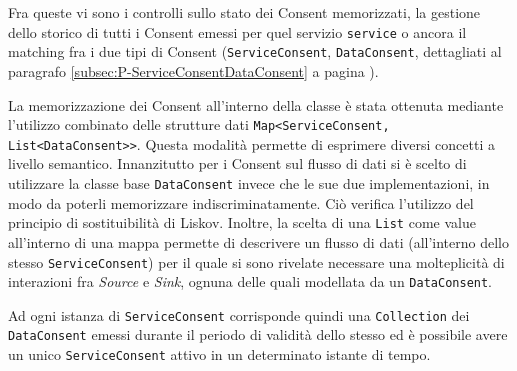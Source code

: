 Fra queste vi sono i controlli sullo stato dei Consent memorizzati, la gestione dello storico di tutti i Consent emessi per quel servizio \texttt{service} o ancora il matching fra i due tipi di Consent (\texttt{ServiceConsent}, \texttt{DataConsent}, dettagliati al paragrafo \ref{subsec:P-ServiceConsentDataConsent} a pagina \pageref{subsec:P-ServiceConsentDataConsent}).

La memorizzazione dei Consent all’interno della classe \`e stata ottenuta mediante l’utilizzo combinato delle strutture dati \texttt{Map<ServiceConsent, \-List\-<Data\-Consent>{}>}. Questa modalit\`a permette di esprimere diversi concetti a livello semantico. Innanzitutto per i Consent sul flusso di dati si \`e scelto di utilizzare la classe base \texttt{DataConsent} invece che le sue due implementazioni, in modo da poterli memorizzare indiscriminatamente. Ci\`o verifica l’utilizzo del principio di sostituibilit\`a di Liskov. Inoltre, la scelta di una \texttt{List} come value all’interno di una mappa permette di descrivere un flusso di dati (all’interno dello stesso \texttt{ServiceConsent}) per il quale si sono rivelate necessare una molteplicit\`a di interazioni fra \textit{Source} e \textit{Sink}, ognuna delle quali modellata da un \texttt{DataConsent}.

Ad ogni istanza di \texttt{ServiceConsent} corrisponde quindi una \texttt{Collection} dei \texttt{DataConsent} emessi durante il periodo di validit\`a dello stesso ed \`e possibile avere un unico \texttt{ServiceConsent} attivo in un determinato istante di tempo.


